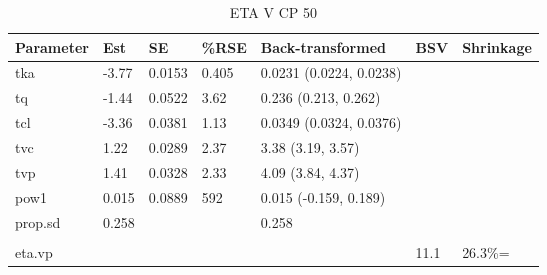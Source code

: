 \begin{table}
\centering\centering
\caption{ETA V CP 50}
\centering
\fontsize{8}{10}\selectfont
\begin{tabular}[t]{lllllll}
\toprule
\textbf{Parameter} & \textbf{Est} & \textbf{SE} & \textbf{\%RSE} & \textbf{Back-transformed} & \textbf{BSV} & \textbf{Shrinkage}\\
\midrule
tka & -3.77 & 0.0153 & 0.405 & 0.0231 (0.0224, 0.0238) &  & \\
\midrule
tq & -1.44 & 0.0522 & 3.62 & 0.236 (0.213, 0.262) &  & \\
\midrule
tcl & -3.36 & 0.0381 & 1.13 & 0.0349 (0.0324, 0.0376) &  & \\
\midrule
tvc & 1.22 & 0.0289 & 2.37 & 3.38 (3.19, 3.57) &  & \\
\midrule
tvp & 1.41 & 0.0328 & 2.33 & 4.09 (3.84, 4.37) &  & \\
\midrule
pow1 & 0.015 & 0.0889 & 592 & 0.015 (-0.159, 0.189) &  & \\
\midrule
prop.sd & 0.258 &  &  & 0.258 &  & \\
\midrule\\
eta.vp &  &  &  &  & 11.1 & 26.3\%=\\
\bottomrule
\end{tabular}
\end{table}